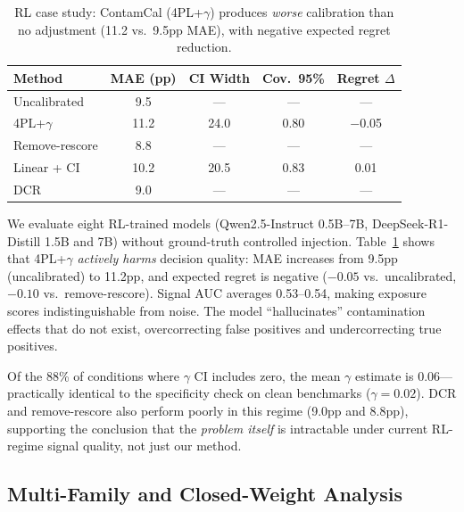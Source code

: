\documentclass[letterpaper,11pt]{article}
\begin{document}
\begin{table}[t]
\centering
\caption{RL case study: ContamCal (4PL+$\gamma$) produces \emph{worse} calibration than no adjustment (11.2 vs.\ 9.5pp MAE), with negative expected regret reduction.}
\label{tab:rl_case}
\begin{tabular}{@{}lcccc@{}}
\toprule
Method & MAE (pp) & CI Width & Cov.\ 95\% & Regret $\Delta$ \\
\midrule
Uncalibrated & 9.5 & --- & --- & --- \\
4PL+$\gamma$ & 11.2 & 24.0 & 0.80 & $-$0.05 \\
Remove-rescore & 8.8 & --- & --- & --- \\
Linear + CI & 10.2 & 20.5 & 0.83 & 0.01 \\
DCR & 9.0 & --- & --- & --- \\
\bottomrule
\end{tabular}
\end{table}

We evaluate eight RL-trained models (Qwen2.5-Instruct 0.5B--7B, DeepSeek-R1-Distill 1.5B and 7B) without ground-truth controlled injection.
Table~\ref{tab:rl_case} shows that 4PL+$\gamma$ \emph{actively harms} decision quality: MAE increases from 9.5pp (uncalibrated) to 11.2pp, and expected regret is negative ($-0.05$ vs.\ uncalibrated, $-0.10$ vs.\ remove-rescore).
Signal AUC averages 0.53--0.54, making exposure scores indistinguishable from noise.
The model ``hallucinates'' contamination effects that do not exist, overcorrecting false positives and undercorrecting true positives.

Of the 88\% of conditions where $\gamma$ CI includes zero, the mean $\gamma$ estimate is 0.06---practically identical to the specificity check on clean benchmarks ($\gamma = 0.02$).
DCR and remove-rescore also perform poorly in this regime (9.0pp and 8.8pp), supporting the conclusion that the \emph{problem itself} is intractable under current RL-regime signal quality, not just our method.

\subsection{Multi-Family and Closed-Weight Analysis}
\label{sec:multi_family}
\end{document}
